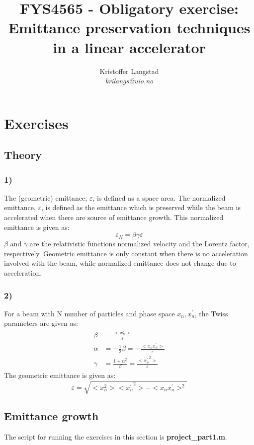 \documentclass[12pt,a4paper,english]{article}
\title{FYS4565 - Obligatory exercise:\\ Emittance preservation techniques in a linear accelerator}
\date{}
\author{ Kristoffer Langstad\\ \textit{krilangs@uio.no}}
\begin{document}
\maketitle
\section*{Exercises}
\label{sect:Exercises}
\subsection*{Theory}
\label{subsect:Theory}
\subsubsection*{1)}
The (geometric) emittance, $\varepsilon$, is defined as a space area. The normalized emittance, $\varepsilon$, is defined as the emittance which is preserved while the beam is accelerated when there are source of emittance growth. This normalized emittance is given as:
\begin{equation}
\label{eq:norm_em}
\varepsilon_N=\beta\gamma\varepsilon
\end{equation}
$\beta$ and $\gamma$ are the relativistic functions normalized velocity and the Lorentz factor, respectively. Geometric emittance is only constant when there is no acceleration involved with the beam, while normalized emittance does not change due to acceleration.

\subsubsection*{2)}
For a beam with N number of particles and phase space ${x_n,x_n^{\prime}}$, the Twiss parameters are given as:
\begin{align}
\beta &= \frac{<x_n^2>}{\varepsilon}\\
\alpha &= -\frac{1}{2}\beta=-\frac{<x_nx_n^{\prime}>}{\varepsilon}\\
\gamma &= \frac{1+\alpha^2}{\beta}=\frac{<{x_n^{\prime}}^2>}{\varepsilon}
\end{align} 
The geometric emittance is given as:
\begin{equation}
\varepsilon= \sqrt{<x_n^2><{x_n^{\prime}}^2>-<x_nx_n^{\prime}>^2}
\end{equation}

\subsection*{Emittance growth}
\label{subsect:Emittance}
The script for running the exercises in this section is \textbf{project\_part1.m}.
\end{document}
